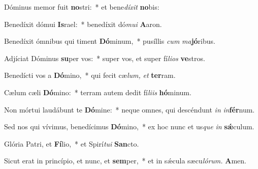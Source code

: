 \item Dóminus memor fuit \textbf{no}stri:~* et bene\textit{díxit} \textbf{no}bis:
\item Benedíxit dómui \textbf{Is}rael:~* benedíxit dó\textit{mui} \textbf{A}aron.
\item  Benedíxit ómnibus qui timent \textbf{Dó}minum,~* pusíllis \textit{cum} \textit{ma}\textbf{jó}ribus.
\item Adjíciat Dóminus \textbf{su}per vos:~* super vos, et super fí\textit{lios} \textbf{ve}stros.
\item Benedícti vos a \textbf{Dó}mino,~* qui fecit cæ\textit{lum,} \textit{et} \textbf{ter}ram.
\item Cælum cæli \textbf{Dó}mino:~* terram autem dedit fí\textit{liis} \textbf{hó}minum.
\item Non mórtui laudábunt te \textbf{Dó}mine:~* neque omnes, qui descéndunt \textit{in} \textit{in}\textbf{fér}num.
\item Sed nos qui vívimus, benedícimus \textbf{Dó}mino,~* ex hoc nunc et us\textit{que} \textit{in} \textbf{sǽ}culum.
\item Glória Patri, et \textbf{Fí}lio,~* et Spirí\tinyhspace\textit{tui} \textbf{San}cto.
\item Sicut erat in princípio, et nunc, et \textbf{sem}per,~* et in sǽcula sæcu\tinyhspace\textit{lórum.} \textbf{A}men.
